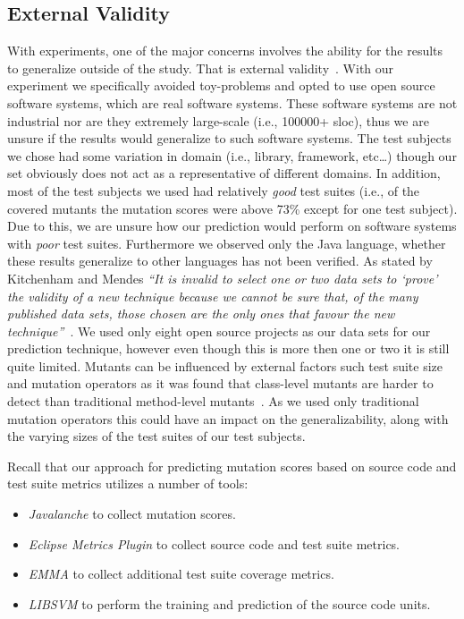 \subsection{External Validity}
\label{subsec:experiment_external_validity}
With experiments, one of the major concerns involves the ability for the results to generalize outside of the study. That is external validity~\cite{WRH+00,WKP10}. With our experiment we specifically avoided toy-problems and opted to use open source software systems, which are real software systems. These software systems are not industrial nor are they extremely large-scale (i.e., 100000+ \gls{sloc}), thus we are unsure if the results would generalize to such software systems. The test subjects we chose had some variation in domain (i.e., library, framework, etc\ldots) though our set obviously does not act as a representative of different domains. In addition, most of the test subjects we used had relatively \emph{good} test suites (i.e., of the covered mutants the mutation scores were above 73\% except for one test subject). Due to this, we are unsure how our prediction would perform on software systems with \emph{poor} test suites. Furthermore we observed only the Java language, whether these results generalize to other languages has not been verified. As stated by Kitchenham and Mendes \emph{``It is invalid to select one or two data sets to `prove' the validity of a new technique because we cannot be sure that, of the many published data sets, those chosen are the only ones that favour the new technique''}~\cite{KM09}. We used only eight open source projects as our data sets for our prediction technique, however even though this is more then one or two it is still quite limited.  Mutants can be influenced by external factors such test suite size and mutation operators as it was found that class-level mutants are harder to detect than traditional method-level mutants~\cite{NK11}. As we used only traditional mutation operators this could have an impact on the generalizability, along with the varying sizes of the test suites of our test subjects.

Recall that our approach for predicting mutation scores based on source code and test suite metrics utilizes a number of tools:

\begin{itemize}
  \item \emph{Javalanche} to collect mutation scores.
  \item \emph{Eclipse Metrics Plugin} to collect source code and test suite metrics.
  \item \emph{EMMA} to collect additional test suite coverage metrics.
  \item \emph{LIBSVM} to perform the training and prediction of the source code units.
\end{itemize}

